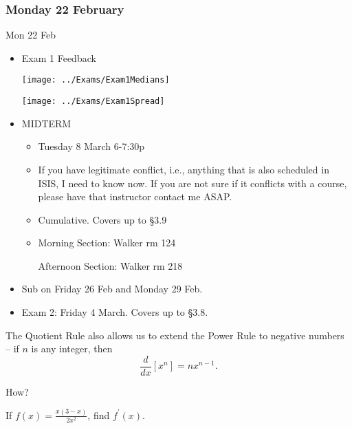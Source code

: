 \documentclass[cal1spr16Lectures.tex]{subfiles}
\begin{document}

\subsubsection{\bf Monday 22 February}
\begin{frame}[allowframebreaks]{Mon 22 Feb}
\begin{itemize}\footnotesize
\item Exam 1 Feedback

\texttt{[image: ../Exams/Exam1Medians]}
\begin{center}
\texttt{[image: ../Exams/Exam1Spread]}
\end{center}
\framebreak
\item MIDTERM 
\begin{itemize}
	\item Tuesday 8 March 6-7:30p
	\item If you have legitimate conflict, i.e., anything that is also scheduled in ISIS, I need to know now.  If you are not sure if it conflicts with a course, please have that instructor contact me ASAP.
	\item Cumulative.  Covers up to \S 3.9
	\item Morning Section: Walker rm 124
	
	Afternoon Section: Walker rm 218
\end{itemize}
\item Sub on Friday 26 Feb and Monday 29 Feb.
\item Exam 2: Friday 4 March.  Covers up to \S 3.8.
\end{itemize}
\end{frame}

\begin{frame}{}
The Quotient Rule also allows us to extend the Power Rule to negative numbers -- if $n$ is any integer, then 
\[\frac{d}{dx}\left[ x^n \right] = nx^{n-1}.\]
\begin{que} How? \end{que}
\end{frame}

\begin{frame}
\begin{exe} If $f(x)=\frac{x(3-x)}{2x^2}$, find $f^{\prime}(x).$ \end{exe}
\end{frame}
\end{document}
